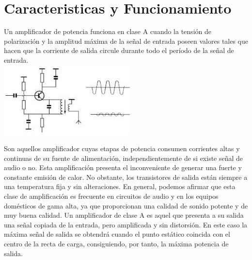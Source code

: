 \documentclass[10pt,a4paper]{article}
\begin{document}
\part{Caracteristicas y Funcionamiento }
Un amplificador de potencia funciona en clase A cuando la tensión de polarización y la amplitud máxima de la señal de entrada poseen valores tales que hacen que la corriente de salida circule durante todo el período de la señal de entrada.\\
\centering
\includegraphics[scale=1]{ampli.jpg}\\
\raggedright
Son aquellos amplificador cuyas etapas de potencia consumen corrientes altas y continuas de su fuente de alimentación, independientemente de si existe señal de audio o no. Esta amplificación presenta el inconveniente de generar una fuerte y constante emisión de calor. No obstante, los transistores de salida están siempre a una temperatura fija y sin alteraciones. En general, podemos afirmar que esta clase de amplificación es frecuente en circuitos de audio y en los equipos domésticos de gama alta, ya que proporcionan una calidad de sonido potente y de muy buena calidad. Un amplificador de  clase A es aquel que presenta a su salida una señal copiada de la entrada, pero amplificada y sin distorsión. En este caso la máxima señal de salida se obtendrá cuando el punto estático coincida con el centro de la recta de carga, consiguiendo, por tanto, la máxima potencia de salida.\\
\centering
\end{document}
